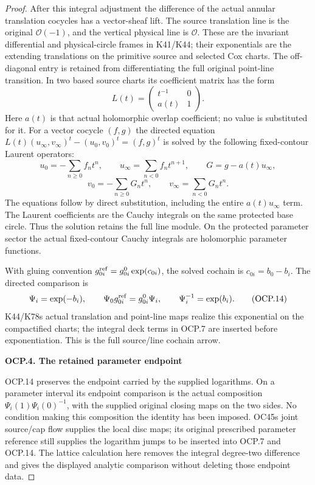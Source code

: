 \begin{proof}
After this integral adjustment the difference of the actual annular
translation cocycles has a vector-sheaf lift. The source translation
line is the original \(\mathcal O(-1)\), and the vertical physical
line is \(\mathcal O\). These are the invariant differential and
physical-circle frames in K41/K44; their exponentials are the extending
translations on the primitive source and selected Cox charts. The
off-diagonal entry is retained from differentiating the full original
point-line transition. In two based source charts its coefficient
matrix has the form
\[
L(t)=\begin{pmatrix}t^{-1}&0\\a(t)&1\end{pmatrix}.
\tag{OCP.11}
\]
Here \(a(t)\) is that actual holomorphic overlap coefficient; no value
is substituted for it. For a vector cocycle \((f,g)\) the directed
equation \(L(t)(u_\infty,v_\infty)^t-(u_0,v_0)^t=(f,g)^t\) is solved by
the following fixed-contour Laurent operators:
\[
u_0=-\sum_{n\geq0}f_nt^n,\qquad
u_\infty=\sum_{n<0}f_nt^{n+1},\qquad
G=g-a(t)u_\infty,
\tag{OCP.12}
\]
\[
v_0=-\sum_{n\geq0}G_nt^n,\qquad
v_\infty=\sum_{n<0}G_nt^n.
\tag{OCP.13}
\]
The equations follow by direct substitution, including the entire
\(a(t)u_\infty\) term. The Laurent coefficients are the Cauchy
integrals on the same protected base circle. Thus the solution retains
the full line module. On the protected parameter sector the actual
fixed-contour Cauchy integrals are holomorphic parameter functions.

With gluing convention \(g_{0i}^{\rm ref}=g_{0i}^0\exp(c_{0i})\),
the solved cochain is \(c_{0i}=b_0-b_i\). The directed comparison is
\[
\Psi_i=\exp(-b_i),\qquad
\Psi_0g_{0i}^{\rm ref}=g_{0i}^0\Psi_i,
\qquad \Psi_i^{-1}=\exp(b_i).
\tag{OCP.14}
\]
K44/K78\textquotesingle s actual translation and point-line maps realize this exponential
on the compactified charts; the integral deck terms in OCP.7 are inserted
before exponentiation. This is the full source/line cochain arrow.

\par

\medskip\noindent\textbf{OCP.4. The retained parameter endpoint}

\par\nobreak

OCP.14 preserves the endpoint carried by the supplied logarithms. On a
parameter interval its endpoint comparison is the actual composition
\(\Psi_i(1)\Psi_i(0)^{-1}\), with the supplied original closing maps
on the two sides. No condition making this composition the identity
has been imposed. OC45\textquotesingle s joint source/cap flow supplies the local
disc maps; its original prescribed parameter reference still supplies
the logarithm jumps to be inserted into OCP.7 and OCP.14. The lattice
calculation here removes the integral degree-two difference and gives
the displayed analytic comparison without deleting those endpoint data.


\end{proof}
